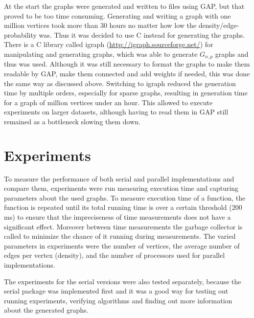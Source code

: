 \documentclass{report}
\theoremstyle{plain}
\theoremstyle{definition}
\theoremstyle{remark}
\begin{document}
At the start the graphs were generated and written to files using GAP, but that proved to be too time consuming. Generating and writing a graph with one million vertices took more than 30 hours no matter how low the density/edge-probability was. Thus it was decided to use C instead for generating the graphs. There is a C library called igraph (\url{http://igraph.sourceforge.net/}) for manipulating and generating graphs, which was able to generate $G_{n,p}$ graphs and thus was used. Although it was still necessary to format the graphs to make them readable by GAP, make them connected and add weights if needed, this was done the same way as discussed above. Switching to igraph reduced the generation time by multiple orders, especially for sparse graphs, resulting in generation time for a graph of million vertices under an hour. This allowed to execute experiments on larger datasets, although having to read them in GAP still remained as a bottleneck slowing them down.

\section{Experiments}

To measure the performance of both serial and parallel implementations and compare them, experiments were run measuring execution time and capturing parameters about the used graphs. To measure execution time of a function, the function is repeated until its total running time is over a certain threshold (200 ms) to ensure that the impreciseness of time measurements does not have a significant effect. Moreover between time measurements the garbage collector is called to minimize the chance of it running during measurements. The varied parameters in experiments were the number of vertices, the average number of edges per vertex (density), and the number of processors used for parallel implementations.

The experiments for the serial versions were also tested separately, because the serial package was implemented first and it was a good way for testing out running experiments, verifying algorithms and finding out more information about the generated graphs.
\end{document}

